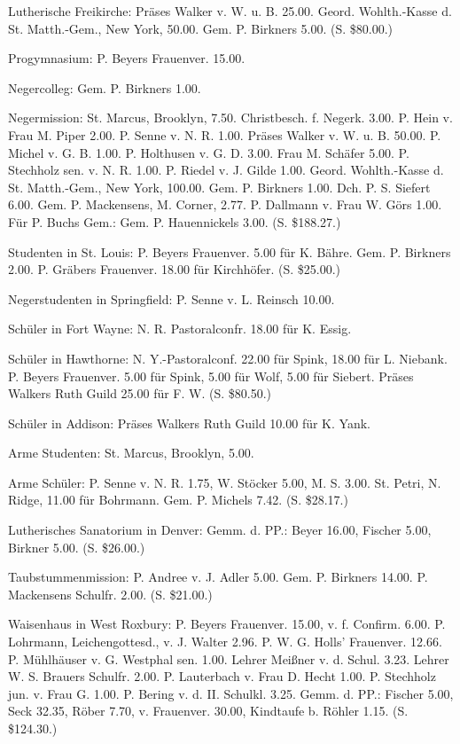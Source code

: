 Lutherische Freikirche: Präses Walker v. W. u. B. 25.00. Geord. Wohlth.-Kasse d. St. Matth.-Gem., New York, 50.00. Gem. P. Birkners 5.00. (S. \$80.00.)

Progymnasium: P. Beyers Frauenver. 15.00.

Negercolleg: Gem. P. Birkners 1.00.

Negermission: St. Marcus, Brooklyn, 7.50. Christbesch. f. Negerk. 3.00. P. Hein v. Frau M. Piper 2.00. P. Senne v. N. R. 1.00. Präses Walker v. W. u. B. 50.00. P. Michel v. G. B. 1.00. P. Holthusen v. G. D. 3.00. Frau M. Schäfer 5.00. P. Stechholz sen. v. N. R. 1.00. P. Riedel v. J. Gilde 1.00. Geord. Wohlth.-Kasse d. St. Matth.-Gem., New York, 100.00. Gem. P. Birkners 1.00. Dch. P. S. Siefert 6.00. Gem. P. Mackensens, M. Corner, 2.77. P. Dallmann v. Frau W. Görs 1.00. Für P. Buchs Gem.: Gem. P. Hauennickels 3.00. (S. \$188.27.)

Studenten in St. Louis: P. Beyers Frauenver. 5.00 für K. Bähre. Gem. P. Birkners 2.00. P. Gräbers Frauenver. 18.00 für Kirchhöfer. (S. \$25.00.)

Negerstudenten in Springfield: P. Senne v. L. Reinsch 10.00.

Schüler in Fort Wayne: N. R. Pastoralconfr. 18.00 für K. Essig.

Schüler in Hawthorne: N. Y.-Pastoralconf. 22.00 für Spink, 18.00 für L. Niebank. P. Beyers Frauenver. 5.00 für Spink, 5.00 für Wolf, 5.00 für Siebert. Präses Walkers Ruth Guild 25.00 für F. W. (S. \$80.50.)

Schüler in Addison: Präses Walkers Ruth Guild 10.00 für K. Yank.

Arme Studenten: St. Marcus, Brooklyn, 5.00.

Arme Schüler: P. Senne v. N. R. 1.75, W. Stöcker 5.00, M. S. 3.00. St. Petri, N. Ridge, 11.00 für Bohrmann. Gem. P. Michels 7.42. (S. \$28.17.)

Lutherisches Sanatorium in Denver: Gemm. d. PP.: Beyer 16.00, Fischer 5.00, Birkner 5.00. (S. \$26.00.)

Taubstummenmission: P. Andree v. J. Adler 5.00. Gem. P. Birkners 14.00. P. Mackensens Schulfr. 2.00. (S. \$21.00.)

Waisenhaus in West Roxbury: P. Beyers Frauenver. 15.00, v. f. Confirm. 6.00. P. Lohrmann, Leichengottesd., v. J. Walter 2.96. P. W. G. Holls’ Frauenver. 12.66. P. Mühlhäuser v. G. Westphal sen. 1.00. Lehrer Meißner v. d. Schul. 3.23. Lehrer W. S. Brauers Schulfr. 2.00. P. Lauterbach v. Frau D. Hecht 1.00. P. Stechholz jun. v. Frau G. 1.00. P. Bering v. d. II. Schulkl. 3.25. Gemm. d. PP.: Fischer 5.00, Seck 32.35, Röber 7.70, v. Frauenver. 30.00, Kindtaufe b. Röhler 1.15. (S. \$124.30.)


